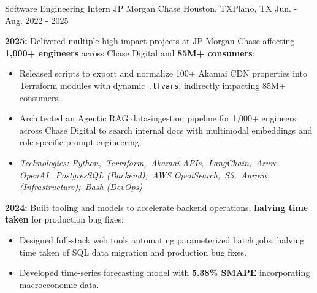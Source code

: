 

\begin{cventries}


    \cventry
    {Software Engineering Intern} %
    {JP Morgan Chase} %
    {Houston, TX\newline Plano, TX} %
    {Jun. - Aug. 2022 - 2025} %
    {
         \begin{cvitems} %
          \item {\textbf{2025:} Delivered multiple high-impact projects at JP Morgan Chase affecting \textbf{1,000+ engi\-neers} across Chase Digital and \textbf{85M+ con\-sumers}:
          \begin{itemize}
            \item Released scripts to export and normalize 100+ Akamai CDN properties into Terraform modules with dynamic \texttt{.tfvars}, indi\-rectly impacting 85M+ con\-sumers.
            \item Architected an Agentic RAG data-ingestion pipeline for 1,000+ engi\-neers across Chase Digital to search internal docs with multi\-modal embeddings and role-specific prompt engi\-neering.
            \item \textit{Technologies: Python,\allowbreak\ Terraform,\allowbreak\ Akamai APIs,\allowbreak\ LangChain,\allowbreak\ Azure OpenAI,\allowbreak\ PostgresSQL (Backend);\allowbreak\ AWS OpenSearch,\allowbreak\ S3,\allowbreak\ Aurora (Infrastructure);\allowbreak\ Bash (DevOps)}
          \end{itemize}
          }
          \item { \textbf{2024:} Built tooling and models to accelerate backend operations, \textbf{halving time taken} for production bug fixes:
          \begin{itemize}
            \item Designed full-stack web tools automating parameterized batch jobs, halving time taken of SQL data migration and production bug fixes.
            \item Developed time-series forecasting model with \textbf{5.38\% SMAPE} incorporating macro\-economic data.

\end{itemize}}
\end{cvitems}}
\end{cventries}
